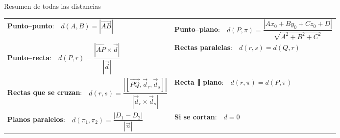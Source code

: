 \documentclass[11pt,a4paper]{article}
\begin{document}
\begin{fmprop}{Resumen de todas las distancias}
\begin{center}\renewcommand{\arraystretch}{1.6}\begin{tabularx}{\linewidth}{XX}
\textbf{Punto--punto}:\ \ $\displaystyle d(A,B)=|\overrightarrow{AB}|$ & \textbf{Punto--plano}:\ \ $\displaystyle d(P,\pi)=\dfrac{|Ax_0+By_0+Cz_0+D|}{\sqrt{A^2+B^2+C^2}}$\\[6pt]
\textbf{Punto--recta}:\ \ $\displaystyle d(P,r)=\dfrac{|\overrightarrow{AP}\times\vec d|}{|\vec d|}$ & \textbf{Rectas paralelas}:\ \ $\displaystyle d(r,s)=d(Q,r)$\\[6pt]
\textbf{Rectas que se cruzan}:\ \ $\displaystyle d(r,s)=\dfrac{|[\overrightarrow{PQ},\vec d_r,\vec d_s]|}{|\vec d_r\times\vec d_s|}$ & \textbf{Recta ∥ plano}:\ \ $\displaystyle d(r,\pi)=d(P,\pi)$\\[6pt]
\textbf{Planos paralelos}:\ \ $\displaystyle d(\pi_1,\pi_2)=\dfrac{|D_1-D_2|}{|\vec n|}$ & \textbf{Si se cortan}:\ \ $\displaystyle d=0$\\[6pt]
\end{tabularx}\end{center}
\end{fmprop}
\end{document}
